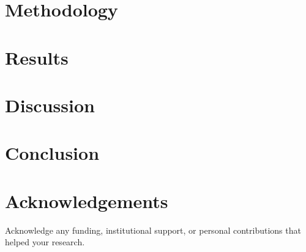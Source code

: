 \documentclass[12pt,twoside]{article}
\begin{document}
\section{Methodology}
\label{sec:method}



\section{Results}
\label{sec:result}

\section{Discussion}
\label{sec:discuss}

\section{Conclusion}
\label{sec:conclusion}

\section*{Acknowledgements}
Acknowledge any funding, institutional support, or personal contributions that helped your research.


\end{document}
